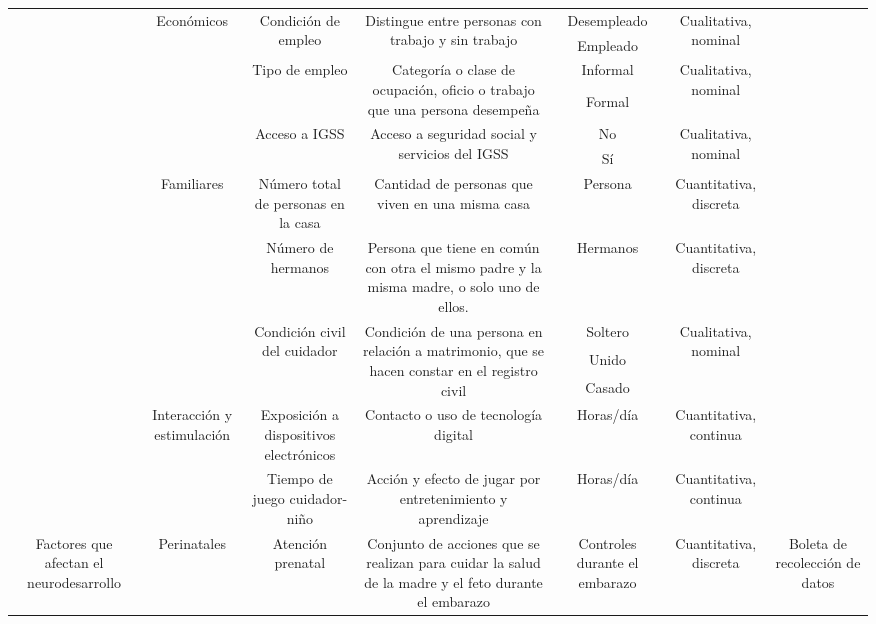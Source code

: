 \documentclass[11pt,letterpaper]{report}
\begin{document}
\begin{landscape}
\begin{longtable}{|c|c|c|c|c|c|c|}
 & \multirow{6}{*}{Económicos} & \multirow{2}{*}{Condición de empleo} & \multirow{2}{*}{Distingue entre personas con trabajo y sin trabajo} & Desempleado & \multirow{2}{*}{Cualitativa, nominal} &  \\ \cline{5-5}
 &  &  &  & Empleado &  &  \\ \cline{3-6}
 &  & \multirow{2}{*}{Tipo de empleo} & \multirow{2}{*}{Categoría o clase de ocupación, oficio o trabajo que una persona desempeña} & Informal & \multirow{2}{*}{Cualitativa, nominal} &  \\ \cline{5-5}
 &  &  &  & Formal &  &  \\ \cline{3-6}
 &  & \multirow{2}{*}{Acceso a IGSS} & \multirow{2}{*}{Acceso a seguridad social y servicios del IGSS} & No & \multirow{2}{*}{Cualitativa, nominal} &  \\ \cline{5-5}
 &  &  &  & Sí &  &  \\ \cline{2-6}
 & \multirow{5}{*}{Familiares} & Número total de personas en la casa & Cantidad de personas que viven en una misma casa & Persona & Cuantitativa, discreta &  \\ \cline{3-6}
 &  & Número de hermanos & Persona que tiene en común con otra el mismo padre y la misma madre, o solo uno de ellos. & Hermanos & Cuantitativa, discreta &  \\ \cline{3-6}
 &  & \multirow{3}{*}{Condición civil del cuidador} & \multirow{3}{*}{Condición de una persona en relación a matrimonio, que se hacen constar en el registro civil} & Soltero & \multirow{3}{*}{Cualitativa, nominal} &  \\ \cline{5-5}
 &  &  &  & Unido &  &  \\ \cline{5-5}
 &  &  &  & Casado &  &  \\ \cline{2-6}
 & \multirow{2}{*}{Interacción y estimulación} & Exposición a dispositivos electrónicos & Contacto o uso de tecnología digital & Horas/día & Cuantitativa, continua &  \\ \cline{3-6}
 &  & Tiempo de juego cuidador-niño & Acción y efecto de jugar por entretenimiento y aprendizaje & Horas/día & Cuantitativa, continua &  \\ \hline
\multirow{42}{*}{Factores que afectan el neurodesarrollo} & \multirow{19}{*}{Perinatales} & \multirow{2}{*}{Atención prenatal} & \multirow{2}{*}{Conjunto de acciones que se realizan para cuidar la salud de la madre y el feto durante el embarazo} & \multirow{2}{*}{Controles durante el embarazo} & \multirow{2}{*}{Cuantitativa, discreta} & \multirow{26}{*}{Boleta de recolección de datos} \\

\end{longtable}
\end{landscape}
\end{document}
